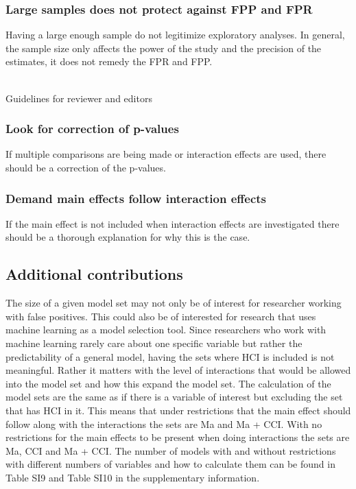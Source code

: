 \subsubsection{Large samples does not protect against FPP and FPR}
Having a large enough sample do not legitimize exploratory analyses. In general, the sample size only affects the power of the study and the precision of the estimates, it does not remedy the FPR and FPP. 

\hfill\\
Guidelines for reviewer and editors
\hfill\\
\subsubsection{Look for correction of p-values}
If multiple comparisons are being made or interaction effects are used, there should be a correction of the p-values.
\subsubsection{Demand main effects follow interaction effects}
If the main effect is not included when interaction effects are investigated there should be a thorough explanation for why this is the case.

\subsection{Additional contributions}
The size of a given model set may not only be of interest for researcher working with false positives. This could also be of interested for research that uses machine learning as a model selection tool. Since researchers who work with machine learning rarely care about one specific variable but rather the predictability of a general model, having the sets where HCI is included is not meaningful. Rather it matters with the level of interactions that would be allowed into the model set and how this expand the model set. The calculation of the model sets are the same as if there is a variable of interest but excluding the set that has HCI in it. This means that under restrictions that the main effect should follow along with the interactions the sets are Ma and Ma + CCI. With no restrictions for the main effects to be present when doing interactions the sets are Ma, CCI and Ma + CCI. The number of models with and without restrictions with different numbers of variables and how to calculate them can be found in Table SI9 and Table SI10 in the supplementary information. 


 
